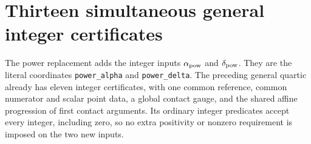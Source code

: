 \section{Thirteen simultaneous general integer certificates}
\label{sec:thirteen-general-certificates}

The power replacement adds the integer inputs
\(\alpha_{\rm pow}\) and \(\delta_{\rm pow}\).
They are the literal coordinates \texttt{power\_alpha} and
\texttt{power\_delta}. The preceding general quartic already has
eleven integer certificates, with one common reference, common
numerator and scalar point data, a global contact gauge, and the
shared affine progression of first contact arguments. Its ordinary
integer predicates accept every integer, including zero, so no extra
positivity or nonzero requirement is imposed on the two new inputs.


